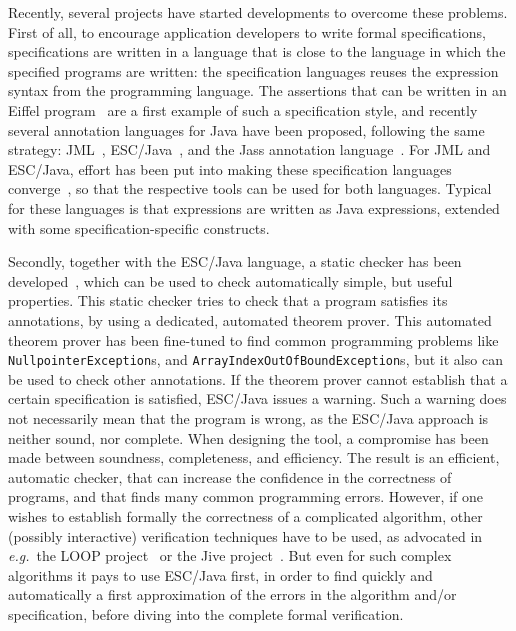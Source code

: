 \documentclass[a4paper]{llncs}
\begin{document}
Recently, several projects have started developments to overcome these
problems. First of all, to encourage application developers to write
formal specifications, specifications are written in a language that
is close to the language in which the specified programs are written:
the specification languages reuses the expression syntax from the
programming language.  The assertions that can be written in an Eiffel
program~\cite{Meyer97} are a first example of such a specification
style, and recently several annotation languages for Java have been
proposed, following the same strategy: JML~\cite{LeavensBR00},
ESC/Java~\cite{ESCJavaUrl}, and the Jass annotation
language~\cite{JassUrl}. For JML and ESC/Java, effort has been put
into making these specification languages converge~\cite{EscJmlDiff},
so that the respective tools can be used for both languages. Typical
for these languages is that expressions are written as Java
expressions, extended with some specification-specific constructs.

Secondly, together with the ESC/Java language, a static checker has
been developed~\cite{ESCJavaUrl}, which can be used to check
automatically simple, but useful properties. This static checker tries
to check that a program satisfies its annotations, by using a
dedicated, automated theorem prover. This automated theorem prover has
been fine-tuned to find common programming problems like
\texttt{Null\-pointer\-Exception}s, and
\texttt{Array\-Index\-Out\-Of\-Bound\-Exception}s, but it also can be
used to check other annotations. If the theorem prover cannot
establish that a certain specification is satisfied, ESC/Java issues a
warning. Such a warning does not necessarily mean that the program is
wrong, as the ESC/Java approach is neither sound, nor complete. When
designing the tool, a compromise has been made between soundness,
completeness, and efficiency. The result is an efficient, automatic
checker, that can increase the confidence in the correctness of
programs, and that finds many common programming errors. However, if
one wishes to establish formally the correctness of a complicated
algorithm, other (possibly interactive) verification techniques have
to be used, as advocated in
\emph{e.g.}~the LOOP project~\cite{LOOPUrl} or the Jive
project~\cite{MeyerP00}. But even for such complex algorithms it pays
to use ESC/Java first, in order to find quickly and automatically a
first approximation of the errors in the algorithm and/or
specification, before diving into the complete formal verification.
\end{document}
